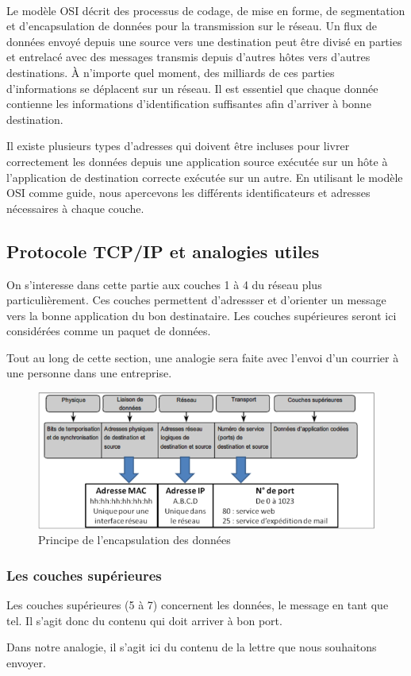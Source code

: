 \documentclass[10pt,fleqn]{article} %
\begin{document}
\paragraph{}
Le modèle OSI décrit des processus de codage, de mise en forme, de segmentation et d'encapsulation de données pour la transmission sur le réseau. Un flux de données envoyé depuis une source vers une destination peut être divisé en parties et entrelacé avec des messages transmis depuis d'autres hôtes vers d'autres destinations. À n'importe quel moment, des milliards de ces parties d'informations se déplacent sur un réseau. Il est essentiel que chaque donnée contienne les informations d'identification suffisantes afin d'arriver à bonne destination.

Il existe plusieurs types d'adresses qui doivent être incluses pour livrer correctement les données depuis une application source exécutée sur un hôte à l'application de destination correcte exécutée sur un autre. En utilisant le modèle OSI comme guide, nous apercevons les différents identificateurs et adresses nécessaires à chaque couche.

\subsection{Protocole TCP/IP et analogies utiles}
On s'interesse dans cette partie aux couches 1 à 4 du réseau plus particulièrement. Ces couches permettent d'adressser et d'orienter un message vers la bonne application du bon destinataire. Les couches supérieures seront ici considérées comme un paquet de données.

Tout au long de cette section, une analogie sera faite avec l'envoi d'un courrier à une personne dans une entreprise.

\begin{figure}[h]
  \centering
  \includegraphics[width=.7\textwidth]{img/reseau_couches_adressage}
  \caption{Principe de l'encapsulation des données}
  \label{fig:res_encap_generique}
\end{figure}

\subsubsection{Les couches supérieures}
Les couches supérieures (5 à 7) concernent les données, le message en tant que tel. Il s'agit donc du contenu qui doit arriver à bon port.
\begin{remark}
  Dans notre analogie, il s'agit ici du contenu de la lettre que nous souhaitons envoyer.
\end{remark}
\end{document}
